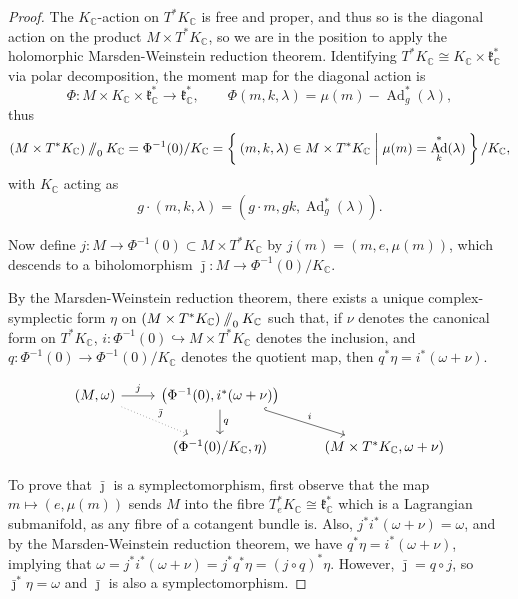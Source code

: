 \documentclass{article}
\newcommand{\lra}{\longrightarrow}
\newcommand{\w}{\omega}
\newcommand{\CC}{\mathbb{C}}
\newcommand{\mfk}{\mathfrak{k}}
\newcommand{\sslash}{\mathbin{/\mkern-6mu/}}
\DeclareMathOperator{\Ad}{Ad}
\begin{document}
	\begin{proof}
		The $K_{\CC}$-action on $T^{\ast}K_{\CC}$ is free and proper, and thus so is the diagonal action on the product $M \times T^{\ast}K_{\CC}$, so we are in the position to apply the holomorphic Marsden-Weinstein reduction theorem. Identifying $T^{\ast}K_{\CC} \cong K_{\CC} \times \mfk_{\CC}^{\ast}$  via polar decomposition, the moment map for the diagonal action is
		\[
			\Phi : M \times K_{\CC} \times \mfk_{\CC}^{\ast} \lra \mfk_{\CC}^{\ast}, \qquad \Phi(m, k, \lambda) = \mu(m) - \Ad_{g}^{\ast}(\lambda),
		\]
		thus
		\[
			(M \times T^{\ast}K_{\CC}) \sslash_{0} K_{\CC} = \Phi^{-1}(0)/K_{\CC} = \Set{ (m,k,\lambda) \in M \times T^{\ast}K_{\CC} | \mu(m) = \Ad_{k}^{\ast}(\lambda) } / K_{\CC},
		\]
		with $K_{\CC}$ acting as
		\[
			g\cdot (m,k,\lambda) = (g\cdot m, gk, \Ad_{g}^{\ast}(\lambda) ).
		\]
		
		Now define $j : M \rightarrow \Phi^{-1}(0) \subset M \times T^{\ast}K_{\CC}$ by $j(m) = (m, e, \mu(m))$, which descends to a biholomorphism $\bar{\jmath} : M \rightarrow \Phi^{-1}(0)/K_{\CC}$.
		
		 By the Marsden-Weinstein reduction theorem, there exists a unique complex-symplectic form $\eta$ on $(M \times T^{\ast}K_{\CC}) \sslash_{0} K_{\CC}$ such that, if $\nu$ denotes the canonical form on $T^{\ast}K_{\CC}$, $i : \Phi^{-1}(0) \hookrightarrow M \times T^{\ast}K_{\CC}$ denotes the inclusion, and $q : \Phi^{-1}(0) \rightarrow \Phi^{-1}(0)/K_{\CC}$ denotes the quotient map, then $q^{\ast}\eta = i^{\ast}(\w + \nu)$.
		
		\[
		\begin{tikzcd}
			(M, \w)\arrow[r, "j"] \arrow[dr, dotted, "\bar{\jmath}"] & \left( \Phi^{-1}(0), i^{\ast}(\w + \nu) \right) \arrow[d, "q"] \arrow[dr, hook, "i"] &  \\
			& (\Phi^{-1}(0) / K_{\CC}, \eta) & (M \times T^{\ast}K_{\CC}, \w + \nu )
		\end{tikzcd}
		\]
		
 		To prove that $\bar{\jmath}$ is a symplectomorphism, first observe that the map $m \mapsto (e, \mu(m))$ sends $M$ into the fibre $T_{e}^{\ast}K_{\CC} \cong \mfk_{\CC}^{\ast}$ which is a Lagrangian submanifold, as any fibre of a cotangent bundle is. Also, $j^{\ast}i^{\ast}(\w + \nu) = \w$, and by the Marsden-Weinstein reduction theorem, we have $q^{\ast}\eta = i^{\ast}(\w + \nu)$, implying that $\w = j^{\ast}i^{\ast}(\w + \nu) = j^{\ast}q^{\ast}\eta = (j \circ q)^{\ast}\eta$. However, $\bar{\jmath} = q \circ j$, so $\bar{\jmath}^{\ast}\eta = \w$ and $\bar{\jmath}$ is also a symplectomorphism.
 		
	\end{proof}
	
\end{document}
